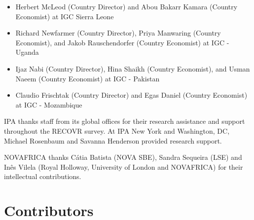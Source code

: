 \documentclass[
  12pt,
]{article}
\providecommand{\tightlist}{%
  \setlength{\itemsep}{0pt}\setlength{\parskip}{0pt}}
\begin{document}
\begin{itemize}
\tightlist
\item
  Herbert McLeod (Country Director) and Abou Bakarr Kamara (Country Economist) at IGC Sierra Leone
\item
  Richard Newfarmer (Country Director), Priya Manwaring (Country Economist), and Jakob Rauschendorfer (Country Economist) at IGC - Uganda
\item
  Ijaz Nabi (Country Director), Hina Shaikh (Country Economist), and Usman Naeem (Country Economist) at IGC - Pakistan
\item
  Claudio Frischtak (Country Director) and Egas Daniel (Country Economist) at IGC - Mozambique
\end{itemize}

IPA thanks staff from its global offices for their research assistance and support throughout the RECOVR survey. At IPA New York and Washington, DC, Michael Rosenbaum and Savanna Henderson provided research support.

NOVAFRICA thanks Cátia Batista (NOVA SBE), Sandra Sequeira (LSE) and Inês Vilela (Royal Holloway, University of London and NOVAFRICA) for their intellectual contributions.

\hypertarget{contributors}{%
\section*{Contributors}\label{contributors}}
\end{document}
